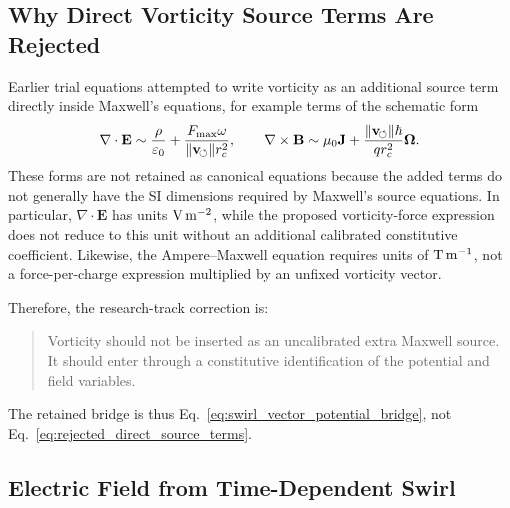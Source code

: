 \subsection{Why Direct Vorticity Source Terms Are Rejected}
    
    Earlier trial equations attempted to write vorticity as an additional
    source term directly inside Maxwell's equations, for example terms of the
    schematic form
    \begin{equation}
        \nabla\cdot\mathbf{E}
        \sim
        \frac{\rho}{\varepsilon_0}
        +
        \frac{F_{\max}\omega}{\lVert\mathbf{v}_{\!\boldsymbol{\circlearrowleft}}\rVert r_c^2},
        \qquad
        \nabla\times\mathbf{B}
        \sim
        \mu_0\mathbf{J}
        +
        \frac{\lVert\mathbf{v}_{\!\boldsymbol{\circlearrowleft}}\rVert\hbar}{qr_c^2}\boldsymbol{\Omega}.
        \label{eq:rejected_direct_source_terms}
    \end{equation}
    These forms are not retained as canonical equations because the added
    terms do not generally have the SI dimensions required by Maxwell's
    source equations.  In particular,
    \(\nabla\cdot\mathbf{E}\) has units
    \({\rm V\,m^{-2}}\), while the proposed vorticity-force expression does
    not reduce to this unit without an additional calibrated constitutive
    coefficient.  Likewise, the Ampere--Maxwell equation requires units of
    \({\rm T\,m^{-1}}\), not a force-per-charge expression multiplied by an
    unfixed vorticity vector.
    
    Therefore, the research-track correction is:
    
    \begin{quote}
        Vorticity should not be inserted as an uncalibrated extra Maxwell source.
        It should enter through a constitutive identification of the potential and
        field variables.
    \end{quote}
    
    The retained bridge is thus Eq.~\eqref{eq:swirl_vector_potential_bridge},
    not Eq.~\eqref{eq:rejected_direct_source_terms}.

\subsection{Electric Field from Time-Dependent Swirl}
    

